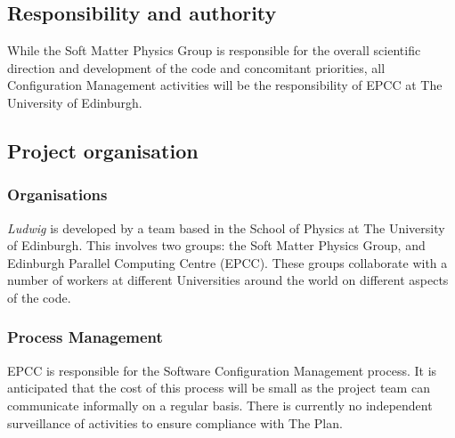 
\subsection{Responsibility and authority}

While the Soft Matter Physics Group is responsible for the overall
scientific direction and development of the code and concomitant
priorities, all Configuration Management activities will
be the responsibility of EPCC at The University of Edinburgh.

\subsection{Project organisation}


\subsubsection{Organisations}

\textit{Ludwig} is developed by a team based in the School of Physics at
The University of Edinburgh. This involves two groups: the Soft Matter
Physics Group, and Edinburgh Parallel Computing Centre (EPCC). These
groups collaborate with a number of workers at different Universities
around the world on different aspects of the code.

\subsubsection{Process Management}

EPCC is responsible for the Software Configuration Management process.
It is anticipated that the cost of this process will be small as the
project team can communicate informally on a regular basis. There is
currently no independent
surveillance of activities to ensure compliance with The Plan.







